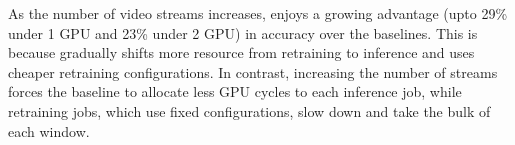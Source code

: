 As the number of video streams increases, \name enjoys a growing advantage (upto 29\% under 1 GPU and 23\% under 2 GPU) in accuracy over the \fair baselines. 
This is because \name gradually shifts more resource from retraining to inference and uses cheaper retraining configurations. %
In contrast, increasing the number of streams forces the \fair baseline to allocate less GPU cycles to each inference job, while retraining jobs, which use fixed configurations, slow down and take the bulk of each window.


